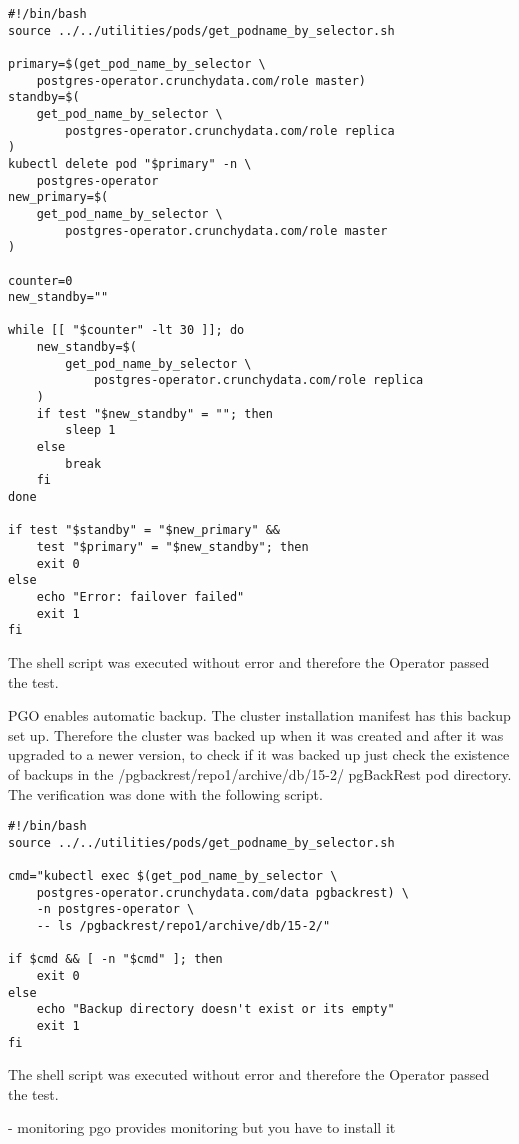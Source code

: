 \begin{verbatim}
#!/bin/bash
source ../../utilities/pods/get_podname_by_selector.sh

primary=$(get_pod_name_by_selector \
    postgres-operator.crunchydata.com/role master)
standby=$(
    get_pod_name_by_selector \
        postgres-operator.crunchydata.com/role replica
)
kubectl delete pod "$primary" -n \
    postgres-operator
new_primary=$(
    get_pod_name_by_selector \
        postgres-operator.crunchydata.com/role master
)

counter=0
new_standby=""

while [[ "$counter" -lt 30 ]]; do
    new_standby=$(
        get_pod_name_by_selector \
            postgres-operator.crunchydata.com/role replica
    )
    if test "$new_standby" = ""; then
        sleep 1
    else
        break
    fi
done

if test "$standby" = "$new_primary" &&
    test "$primary" = "$new_standby"; then
    exit 0
else
    echo "Error: failover failed"
    exit 1
fi
\end{verbatim}

The shell script was executed without error and therefore the Operator passed the test.


PGO enables automatic backup. The cluster installation manifest has this backup set up. Therefore the cluster was backed up when it was created and after it was upgraded to a newer version, to check if it was backed up just check the existence of backups in the /pgbackrest/repo1/archive/db/15-2/ pgBackRest pod directory. The verification was done with the following script.

\begin{verbatim}
#!/bin/bash
source ../../utilities/pods/get_podname_by_selector.sh

cmd="kubectl exec $(get_pod_name_by_selector \
    postgres-operator.crunchydata.com/data pgbackrest) \
    -n postgres-operator \
    -- ls /pgbackrest/repo1/archive/db/15-2/"

if $cmd && [ -n "$cmd" ]; then
    exit 0
else
    echo "Backup directory doesn't exist or its empty"
    exit 1
fi
\end{verbatim}
The shell script was executed without error and therefore the Operator passed the test.

\n{3}{Cluster configuration update}
- monitoring pgo provides monitoring but you have to install it

